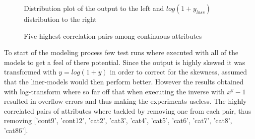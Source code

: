 \documentclass[a4paper]{article}
\begin{document}
\begin{figure}[H]
\centering
{}
\caption{Distribution plot of the output to the left and $log(1 + y_{loss})$ distribution to the right}
\label{fig:loss}
\end{figure}
\begin{figure}[H]
\centering
{}
\caption{Five highest correlation pairs among continuous attributes}
\label{fig:con-corr}
\end{figure}
To start of the modeling process few test runs where executed with all of the models to get a feel of there potential. Since the output is highly skewed it was transformed with $y=log(1 + y)$ in order to correct for the skewness, assumed that the liner-models would then perform better. However the results obtained with log-transform where so far off that when executing the inverse with $x^y - 1$ resulted in overflow errors and thus making the experiments useless.
The highly correlated pairs of attributes where tackled by removing one from each pair, thus removing ['cont9', 'cont12', 'cat2', 'cat3', 'cat4', 'cat5', 'cat6', 'cat7', 'cat8', 'cat86'].
\end{document}

